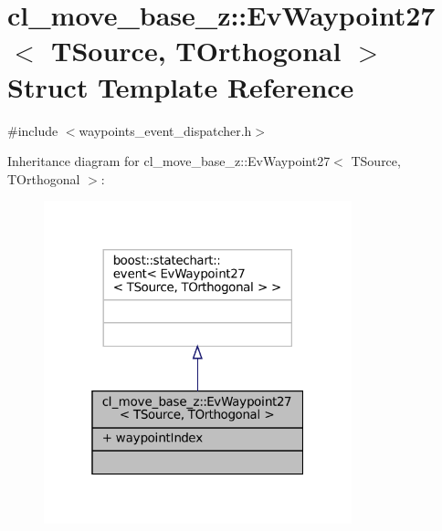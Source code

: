 \hypertarget{structcl__move__base__z_1_1EvWaypoint27}{}\section{cl\+\_\+move\+\_\+base\+\_\+z\+:\+:Ev\+Waypoint27$<$ T\+Source, T\+Orthogonal $>$ Struct Template Reference}
\label{structcl__move__base__z_1_1EvWaypoint27}


{\ttfamily \#include $<$waypoints\+\_\+event\+\_\+dispatcher.\+h$>$}



Inheritance diagram for cl\+\_\+move\+\_\+base\+\_\+z\+:\+:Ev\+Waypoint27$<$ T\+Source, T\+Orthogonal $>$\+:
\nopagebreak
\begin{figure}[H]
\begin{center}
\leavevmode
\includegraphics[width=253pt]{structcl__move__base__z_1_1EvWaypoint27__inherit__graph}
\end{center}
\end{figure}


